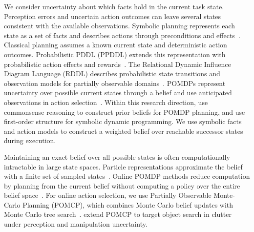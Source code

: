 We consider uncertainty about which facts hold in the current task state. Perception errors and uncertain action outcomes can leave several states consistent with the available observations. Symbolic planning represents each state as a set of facts and describes actions through preconditions and effects~\citep{fikes1971strips,mcdermott1998pddl}. Classical planning assumes a known current state and deterministic action outcomes. Probabilistic PDDL (PPDDL) extends this representation with probabilistic action effects and rewards~\citep{younes2004ppddl1}. The Relational Dynamic Influence Diagram Language (RDDL) describes probabilistic state transitions and observation models for partially observable domains~\citep{sanner2010rddl}. POMDPs represent uncertainty over possible current states through a belief and use anticipated observations in action selection~\citep{kaelbling1998planning}. Within this research direction, \citet{zhang2015corpp} use commonsense reasoning to construct prior beliefs for POMDP planning, and \citet{sanner2010symbolic} use first-order structure for symbolic dynamic programming. We use symbolic facts and action models to construct a weighted belief over reachable successor states during execution.


Maintaining an exact belief over all possible states is often computationally intractable in large state spaces. Particle representations approximate the belief with a finite set of sampled states~\citep{thrun2005probabilistic}. Online POMDP methods reduce computation by planning from the current belief without computing a policy over the entire belief space~\citep{ross2008online}. For online action selection, we use Partially Observable Monte-Carlo Planning (POMCP), which combines Monte Carlo belief updates with Monte Carlo tree search~\citep{silver2010monte}. \citet{xiao2019objectsearch} extend POMCP to target object search in clutter under perception and manipulation uncertainty.


